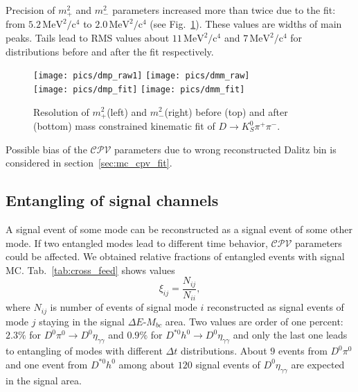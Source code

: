 \documentclass[preprint,aps,showpacs]{revtex4}
\newcommand{\massp}{\ensuremath{m^2_{+}}\xspace}
\newcommand{\massm}{\ensuremath{m^2_{-}}\xspace}
\newcommand{\dt}{\ensuremath{\Delta t}\xspace}
\newcommand{\cpvconj}{\ensuremath{\mathcal{CPV}}\xspace}
\newcommand{\dkpp}{\ensuremath{D\to K^0_S\pi^+\pi^-}\xspace}
\newcommand{\etasubgg}{\ensuremath{\eta_{\gamma\gamma}}\xspace}
\newcommand{\de}{\ensuremath{\Delta E}\xspace}
\newcommand{\mbc}{\ensuremath{M_{bc}}\xspace}
\begin{document}
Precision of \massp and \massm parameters increased more than twice due to the fit: from $5.2\,\text{MeV}^2/\text{c}^4$ to $2.0\,\text{MeV}^2/\text{c}^4$ (see Fig.~\ref{fig:DalitzResolution}). These values are widths of main peaks. Tails lead to RMS values about $11\,\text{MeV}^2/\text{c}^4$ and $7\,\text{MeV}^2/\text{c}^4$ for distributions before and after the fit respectively.
\begin{figure}[htb]
 \texttt{[image: pics/dmp\_raw1]}
 \texttt{[image: pics/dmm\_raw]}\\
 \texttt{[image: pics/dmp\_fit]}
 \texttt{[image: pics/dmm\_fit]}
\caption{Resolution of \massp (left) and \massm (right) before (top) and after (bottom) mass constrained kinematic fit of \dkpp.}
\label{fig:DalitzResolution}
\end{figure}

Possible bias of the \cpvconj parameters due to wrong reconstructed Dalitz bin is considered in section~\ref{sec:mc_cpv_fit}.

\clearpage
\subsection{Entangling of signal channels }\label{sec:cross_feed}
A signal event of some mode can be reconstructed as a signal event of some other mode. If two entangled modes lead to different time behavior, \cpvconj parameters could be affected. We obtained relative fractions of entangled events with signal MC. Tab.~\ref{tab:cross_feed} shows values
\begin{equation}\label{eq:cross_feed}
 \xi_{ij}=\frac{N_{ij}}{N_{ii}},
\end{equation}
where $N_{ij}$ is number of events of signal mode $i$ reconstructed as signal events of mode $j$ staying in the signal \de-\mbc area. Two values are order of one percent: $2.3\%$ for $D^0\pi^0\to D^0\etasubgg$ and $0.9\%$ for $D^{*0}h^0\to D^0\etasubgg$ and only the last one leads to entangling of modes with different \dt distributions. About $9$ events from $D^0\pi^0$ and one event from $D^{*0}h^0$ among about $120$ signal events of $D^0\etasubgg$ are expected in the signal area.  
\end{document}

